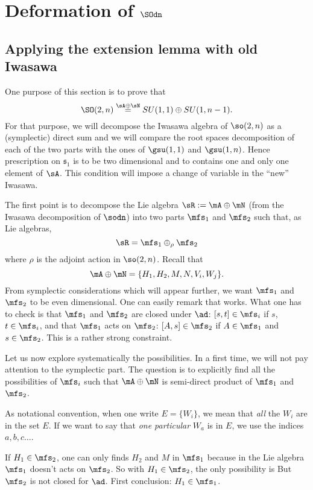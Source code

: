 \section{Deformation of \texorpdfstring{$\SOdn$}{SO2n}}   \label{SecUnifSOdn}

\subsection{Applying the extension lemma with old Iwasawa}

One purpose of this section is to prove that
\[
	\SO(2,n)\stackrel{\sA\oplus\sN}{=}SU(1,1)\oplus SU(1,n-1).
\]
For that purpose, we will decompose the Iwasawa algebra of $\so(2,n)$ as a (symplectic) direct sum and we will compare the root spaces decomposition of each of the two parts with the ones of $\gsu(1,1)$ and $\gsu(1,n)$. Hence prescription on $\mathfrak{s}_1$ is to be two dimensional and to contains one and only one element of $\sA$. This condition will impose a change of variable in the ``new'' Iwasawa.

The first point is to decompose the Lie algebra $\sR:=\mA\oplus\mN$ (from the Iwasawa decomposition of
$\sodn$) into two parts $\mfs_1$ and $\mfs_2$ such that, as Lie algebras,
\[
	\sR=\mfs_1\oplus_{\rho}\mfs_2
\]
where $\rho$ is the adjoint action in $\so(2,n)$. Recall that
\[
	\mA\oplus\mN=\{H_1,H_2,M,N,V_i,W_j\}.
\]
From symplectic considerations which will appear further, we want $\mfs_1$ and $\mfs_2$ to be even dimensional.
One can easily remark that
works. What one has to check is that $\mfs_1$ and $\mfs_2$ are closed under $\ad$: $[s,t]\in\mfs_i$ if $s$, $t\in\mfs_i$, and that $\mfs_1$ acts on $\mfs_2$: $[A,s]\in\mfs_2$ if $A\in\mfs_1$ and $s\in\mfs_2$. This is a rather strong constraint.

Let us now explore systematically the possibilities. In a first time, we will not pay attention to the symplectic part. The question is to explicitly find all the possibilities of $\mfs_i$ such that $\mA\oplus\mN$ is semi-direct product of $\mfs_1$ and $\mfs_2$.

As notational convention, when one write $E=\{W_i\}$, we mean that \emph{all} the $W_i$ are in the set $E$. If we want to say that \emph{one particular} $W_a$ is in $E$, we use the indices $a,b,c\ldots$.

If $H_1\in\mfs_2$, one can only finds $H_2$ and $M$ in $\mfs_1$ because in
the Lie algebra $\mfs_1$ doesn't acts on $\mfs_2$. So with $H_1\in\mfs_2$, the only possibility is
But $\mfs_2$ is not closed for $\ad$. First conclusion: $H_1\in\mfs_1$.

